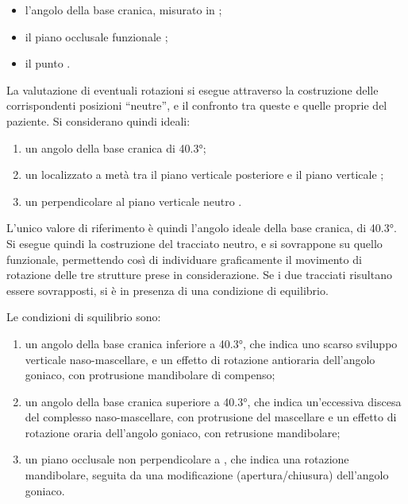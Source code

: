 \begin{itemize}
\item l'angolo della base cranica, misurato in ;
\item il piano occlusale funzionale ;
\item il punto .
\end{itemize}

La valutazione di eventuali rotazioni si esegue attraverso la costruzione delle corrispondenti posizioni ``neutre'', e il confronto tra queste e quelle proprie del paziente. Si considerano quindi ideali:

\begin{enumerate}
\item un angolo della base cranica di 40.3°;
\item un  localizzato a metà tra il piano verticale posteriore  e il piano verticale ;
\item un  perpendicolare al piano verticale neutro .
\end{enumerate}

L'unico valore di riferimento è quindi l'angolo ideale della base cranica, di 40.3°. Si esegue quindi la costruzione del tracciato neutro, e si sovrappone su quello funzionale, permettendo così di individuare graficamente il movimento di rotazione delle tre strutture prese in considerazione. Se i due tracciati risultano essere sovrapposti, si è in presenza di una condizione di equilibrio.

Le condizioni di squilibrio sono:

\begin{enumerate}
\item un angolo della base cranica inferiore a 40.3°, che indica uno scarso sviluppo verticale naso-mascellare, e un effetto di rotazione antioraria dell'angolo goniaco, con protrusione mandibolare di compenso;
\item un angolo della base cranica superiore a 40.3°, che indica un'eccessiva discesa del complesso naso-mascellare, con protrusione del mascellare e un effetto di rotazione oraria dell'angolo goniaco, con retrusione mandibolare;
\item un piano occlusale non perpendicolare a , che indica una rotazione mandibolare, seguita da una modificazione (apertura/chiusura) dell'angolo goniaco.
\end{enumerate}
